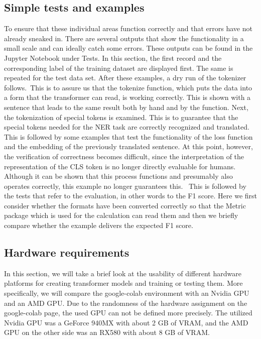 \subsection{Simple tests and examples}
To ensure that these individual areas function correctly and that errors have not already sneaked in. There are several outputs that show the functionality in a small scale and can ideally catch some errors. These outputs can be found in the Jupyter Notebook under Tests. In this section, the first record and the corresponding label of the training dataset are displayed first. The same is repeated for the test data set. After these examples, a dry run of the tokenizer follows. This is to assure us that the tokenize function, which puts the data into a form that the transformer can read, is working correctly. This is shown with a sentence that leads to the same result both by hand and by the function.  Next, the tokenization of special tokens is examined. This is to guarantee that the special tokens needed for the NER task are correctly recognized and translated. This is followed by some examples that test the functionality of the loss function and the embedding of the previously translated sentence. At this point, however, the verification of correctness becomes difficult, since the interpretation of the representation of the CLS token is no longer directly evaluable for humans. Although it can be shown that this process functions and presumably also operates correctly, this example no longer guarantees this.  This is followed by the tests that refer to the evaluation, in other words to the F1 score. Here we first consider whether the formats have been converted correctly so that the Metric package which is used for the calculation can read them and then we briefly compare whether the example delivers the expected F1 score. 

\subsection{Hardware requirements}
In this section, we will take a brief look at the usability of different hardware platforms for creating transformer models and training or testing them. More specifically, we will compare the google-colab environment with an Nvidia GPU and an AMD GPU. Due to the randomness of the hardware assignment on the google-colab page, the used GPU can not be defined more precisely. The utilized Nvidia GPU was a GeForce 940MX with about 2 GB of VRAM, and the AMD GPU on the other side was an RX580 with about 8 GB of VRAM. 

